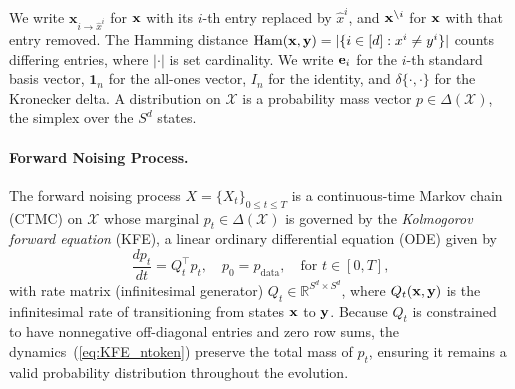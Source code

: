 \documentclass{article} %
\def\eqref#1{equation~\ref{#1}}
\newcommand{\bfe}{{\bf e}}
\newcommand{\bfx}{{\bf x}}
\newcommand{\bfy}{ {\bf y}}
\newcommand{\xito}{\mathbf{x}_{i \to \hat{x}^i}}
\renewcommand{\eqref}[1]{\textup{(\ref{#1})}}
\begin{document}
We write $\xito$ for $\bfx$ with its $i$-th entry replaced by $\hat{x}^i$, and $\bfx^{\backslash i}$ for $\bfx$ with that entry removed. The Hamming distance $\mathrm{Ham}(\bfx,\bfy) = |\{i \in [d] : x^i \neq y^i\}|$ counts differing entries, where $|\cdot|$ is set cardinality. We write $\bfe_i$ for the $i$-th standard basis vector, $\mathbf{1}_n$ for the all-ones vector, $I_n$ for the identity, and $\delta\{\cdot,\cdot\}$ for the Kronecker delta. A distribution on $\mathcal{X}$ is a probability mass vector $p \in \Delta(\mathcal{X})$, the simplex over the $S^d$ states.
 
\paragraph{Forward Noising Process.} The forward noising process $X=\{X_t\}_{0 \leq t \leq T}$ is a continuous-time Markov chain (CTMC) on $\mathcal{X}$ whose marginal $p_t \in \Delta(\mathcal{X})$ is governed by the \emph{Kolmogorov forward equation} (KFE), a linear ordinary differential equation (ODE) given by
\newcommand{\KFEntokeneq}{\frac{dp_t}{dt}=Q_t^\top p_t, \quad p_0=p_{\mathrm{data}}, \quad \text{for } t \in [0, T]}
\begin{equation}\label{eq:KFE_ntoken}
    \KFEntokeneq ,
\end{equation}
with rate matrix (infinitesimal generator) $Q_t \in \mathbb{R}^{S^d \times S^d}$, where $Q_t(\bfx, \bfy)$ is the infinitesimal rate of transitioning from states $\bfx$ to $\bfy$. Because $Q_t$ is constrained to have nonnegative off-diagonal entries and zero row sums, the dynamics~\eqref{eq:KFE_ntoken} preserve the total mass of $p_t$, ensuring it remains a valid probability distribution throughout the evolution. 
 
\end{document}

